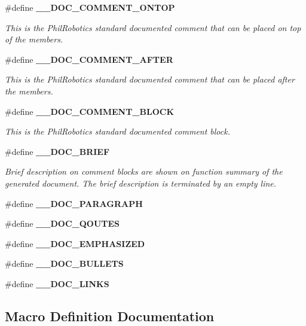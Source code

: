 \begin{DoxyCompactItemize}
\#define {\bf \-\_\-\-\_\-\-D\-O\-C\-\_\-\-C\-O\-M\-M\-E\-N\-T\-\_\-\-O\-N\-T\-O\-P}
\begin{DoxyCompactList}\small\item\em This is the Phil\-Robotics standard documented comment that can be placed on top of the members. \end{DoxyCompactList}\item 
\#define {\bf \-\_\-\-\_\-\-D\-O\-C\-\_\-\-C\-O\-M\-M\-E\-N\-T\-\_\-\-A\-F\-T\-E\-R}
\begin{DoxyCompactList}\small\item\em This is the Phil\-Robotics standard documented comment that can be placed after the members. \end{DoxyCompactList}\item 
\#define {\bf \-\_\-\-\_\-\-D\-O\-C\-\_\-\-C\-O\-M\-M\-E\-N\-T\-\_\-\-B\-L\-O\-C\-K}
\begin{DoxyCompactList}\small\item\em This is the Phil\-Robotics standard documented comment block. \end{DoxyCompactList}\item 
\#define {\bf \-\_\-\-\_\-\-D\-O\-C\-\_\-\-B\-R\-I\-E\-F}
\begin{DoxyCompactList}\small\item\em Brief description on comment blocks are shown on function summary of the generated document. The brief description is terminated by an empty line. \end{DoxyCompactList}\item 
\#define {\bf \-\_\-\-\_\-\-D\-O\-C\-\_\-\-P\-A\-R\-A\-G\-R\-A\-P\-H}
\item 
\#define {\bf \-\_\-\-\_\-\-D\-O\-C\-\_\-\-Q\-O\-U\-T\-E\-S}
\item 
\#define {\bf \-\_\-\-\_\-\-D\-O\-C\-\_\-\-E\-M\-P\-H\-A\-S\-I\-Z\-E\-D}
\item 
\#define {\bf \-\_\-\-\_\-\-D\-O\-C\-\_\-\-B\-U\-L\-L\-E\-T\-S}
\item 
\#define {\bf \-\_\-\-\_\-\-D\-O\-C\-\_\-\-L\-I\-N\-K\-S}
\end{DoxyCompactItemize}


\subsection{Macro Definition Documentation}
